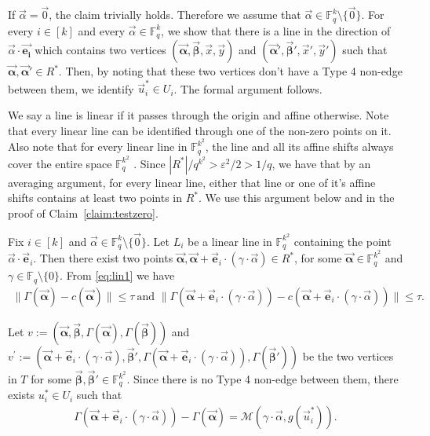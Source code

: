 \documentclass[11pt]{article}
\newcommand{\F}{\mathbb{F}}
\renewcommand{\le}{ \leqslant}
\newcommand{\alphab}{\vec{\bm{\alpha}}}
\newcommand{\betab}{\vec{\bm{\beta}}}
\renewcommand{\kappa}{\tau}
\newcommand{\M}{\mathcal{M}}
\begin{document}
%

If $\vec{\alpha}=\vec{0}$, the claim trivially holds. Therefore we assume that $\vec{\alpha}\in\F_q^k\setminus \{\vec{0}\}$. For every $i\in[k]$ and every $\vec{\alpha}\in \F_q^k$, we show that there is a line in the direction of $\vec{\alpha}\cdot \vec{\bm{e_i}}$ which contains two vertices $(\alphab,\betab,\vec{x},\vec{y})$ and  $(\alphab',\betab',\vec{x}',\vec{y}')$ such that  $\alphab,\alphab'\in R^\ast$. Then, by noting that these two vertices don't have a Type 4 non-edge between them, we identify $\vec{u}_i^\ast\in U_i$. The formal argument follows.

We say a line is linear if it passes through the origin and affine otherwise. Note that every linear line can be identified through one of the non-zero points on it. Also note that for every linear line in $\F_q^{k^2}$, the line   and all its affine shifts always cover the entire space $\F_q^{k^2}$ . 
 Since $|{R}^\ast|/q^{k^2}>\varepsilon^2/2>1/q$, we have that  by an averaging argument,  for every linear line, either that line or one of it's affine shifts   contains at least two points in $R^\ast$. We use this argument below and in the proof of Claim~\ref{claim:testzero}.


Fix $i\in[k]$ and $\vec{\alpha}\in\F_q^k\setminus \{\vec{0}\}$. Let $L_i$ be a linear line in $\F_q^{k^2}$  containing the point  $\vec{\alpha}\cdot \vec{\bm e}_i$. Then there exist two points  $\vec{\bm{\alpha}},\vec{\bm{\alpha}}+\vec{\bm e}_i\cdot (\gamma\cdot\vec{\alpha})\in  {R}^\ast$, for some $\alphab\in\F_q^{k^2}$ and $\gamma\in \F_q\setminus\{0\}$. From \eqref{eq:lin1} we have
\begin{align}
\|\Gamma(\vec{\bm{\alpha}})-c(\vec{\bm{\alpha}})\|\le \kappa\ \text{and } \|\Gamma(\vec{\bm{\alpha}}+\vec{\bm e}_i\cdot (\gamma\cdot\vec{\alpha}))-c(\vec{\bm{\alpha}}+\vec{\bm e}_i\cdot (\gamma\cdot\vec{\alpha}))\|\le \kappa. 
\label{eq:lin2}
\end{align}



Let $v:=(\alphab,\betab,\Gamma(\alphab),\Gamma(\betab))$ and 
$v^{\prime}:=(\alphab+\vec{\bm e}_i\cdot (\gamma\cdot\vec{\alpha}),\betab',\Gamma(\alphab+\vec{\bm e}_i\cdot (\gamma\cdot\vec{\alpha})),\Gamma(\betab'))$  be the two vertices in $T$ for some $\betab,\betab'\in \F_q^{k^2}$. Since there  is no Type 4 non-edge between them,  there exists $u_i^\ast\in U_i$ such that  
\begin{align}
\Gamma(\alphab+\vec{\bm e}_i\cdot (\gamma\cdot\vec{\alpha}))-\Gamma(\alphab)=\M(\gamma\cdot\vec{\alpha},g(\vec{u}_i^\ast)).\label{eq:lin4}
\end{align}
\end{document}
